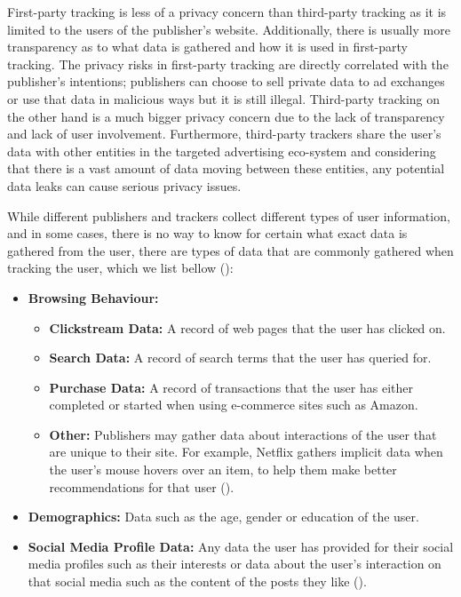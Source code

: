 \documentclass{l4proj}
\begin{document}
First-party tracking is less of a privacy concern than third-party tracking as it is limited to the users of the publisher's website. Additionally, there is usually more transparency as to what data is gathered and how it is used in first-party tracking. The privacy risks in first-party tracking are directly correlated with the publisher's intentions; publishers can choose to sell private data to ad exchanges or use that data in malicious ways but it is still illegal. Third-party tracking on the other hand is a much bigger privacy concern due to the lack of transparency and lack of user involvement. Furthermore, third-party trackers share the user's data with other entities in the targeted advertising eco-system and considering that there is a vast amount of data moving between these entities, any potential data leaks can cause serious privacy issues. 

While different publishers and trackers collect different types of user information, and in some cases, there is no way to know for certain what exact data is gathered from the user, there are types of data that are commonly gathered when tracking the user, which we list bellow (\cite{addata}):
\begin{itemize}
   \item 
   \textbf{Browsing Behaviour:}
   \begin{itemize}
	\item
           \textbf{Clickstream Data:} A record of web pages that the user has clicked on.
	\item
           \textbf{Search Data:} A record of search terms that the user has queried for.
	\item
           \textbf{Purchase Data:} A record of transactions that the user has either completed or started when using e-commerce sites such as Amazon.
	\item
           \textbf{Other:} Publishers may gather data about interactions of the user that are unique to their site. For example, Netflix gathers implicit data when the user's mouse hovers over an item, to help them make better recommendations for that user (\cite{netflix}).
   \end{itemize}
   \item
   \textbf{Demographics:} Data such as the age, gender or education of the user.
   \item
   \textbf{Social Media Profile Data:} Any data the user has provided for their social media profiles such as their interests or data about the user's interaction on that social media such as the content of the posts they like (\cite{fbook}).
\end{itemize}
\end{document}
